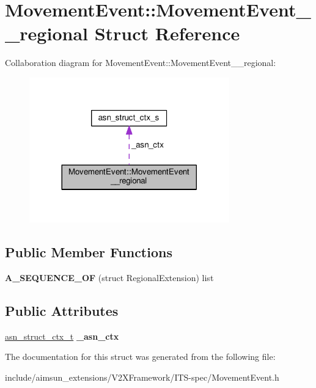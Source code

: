\hypertarget{structMovementEvent_1_1MovementEvent____regional}{}\section{Movement\+Event\+:\+:Movement\+Event\+\_\+\+\_\+regional Struct Reference}
\label{structMovementEvent_1_1MovementEvent____regional}


Collaboration diagram for Movement\+Event\+:\+:Movement\+Event\+\_\+\+\_\+regional\+:\nopagebreak
\begin{figure}[H]
\begin{center}
\leavevmode
\includegraphics[width=245pt]{structMovementEvent_1_1MovementEvent____regional__coll__graph}
\end{center}
\end{figure}
\subsection*{Public Member Functions}
\begin{DoxyCompactItemize}
\item 
{\bfseries A\+\_\+\+S\+E\+Q\+U\+E\+N\+C\+E\+\_\+\+OF} (struct Regional\+Extension) list\hypertarget{structMovementEvent_1_1MovementEvent____regional_a3655f8f1ef13d861aa6362628b4cd3bf}{}\label{structMovementEvent_1_1MovementEvent____regional_a3655f8f1ef13d861aa6362628b4cd3bf}

\end{DoxyCompactItemize}
\subsection*{Public Attributes}
\begin{DoxyCompactItemize}
\item 
\hyperlink{structasn__struct__ctx__s}{asn\+\_\+struct\+\_\+ctx\+\_\+t} {\bfseries \+\_\+asn\+\_\+ctx}\hypertarget{structMovementEvent_1_1MovementEvent____regional_a2c28ca2c52fe4364fc3256fd684203d9}{}\label{structMovementEvent_1_1MovementEvent____regional_a2c28ca2c52fe4364fc3256fd684203d9}

\end{DoxyCompactItemize}


The documentation for this struct was generated from the following file\+:\begin{DoxyCompactItemize}
\item 
include/aimsun\+\_\+extensions/\+V2\+X\+Framework/\+I\+T\+S-\/spec/Movement\+Event.\+h\end{DoxyCompactItemize}
